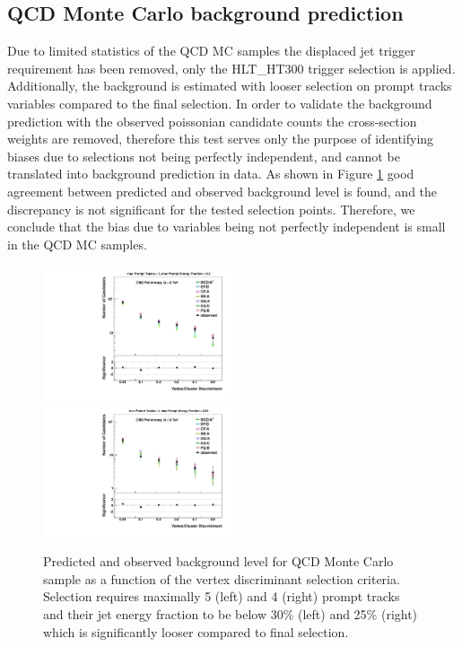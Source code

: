 \subsection{QCD Monte Carlo background prediction}
\label{subsec:bkgQCDMC}

Due to limited statistics of the QCD MC samples the displaced jet trigger requirement has been removed,
 only the HLT\_HT300 trigger selection is applied. Additionally, the background is estimated with looser
 selection on prompt tracks variables compared to the final selection. 
In order to validate the background prediction with 
the observed poissonian candidate counts the cross-section weights are removed, 
therefore this test serves only the purpose of identifying biases due to selections not being
perfectly independent, and cannot be translated
into background prediction in data.  
As shown in Figure \ref{fig:bkg_MC} good agreement between predicted and observed background level is found, 
and the discrepancy is not significant for the tested selection points. Therefore, we conclude that the  
bias due to variables being not perfectly independent is small in the QCD MC samples. 

\begin{figure}[htbp]
  \centering
  \includegraphics[width=0.495\textwidth]{plots/background/bkg_MC1.pdf}
  \includegraphics[width=0.495\textwidth]{plots/background/bkg_MC2.pdf}
  \caption{Predicted and observed background level for QCD Monte Carlo sample as a function of the vertex discriminant selection criteria.
Selection requires maximally 5 (left) and 4 (right)  prompt tracks and their jet energy fraction to be below 30\% (left) and 25\% (right) which
is significantly looser compared to final selection. \label{fig:bkg_MC}}
  \end{figure}


